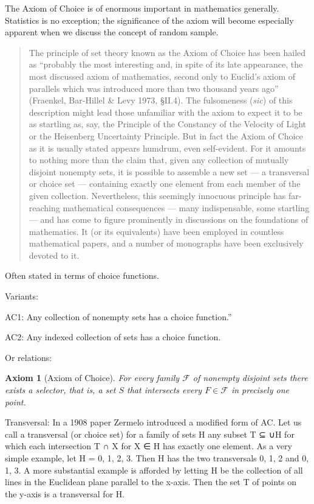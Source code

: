 \documentclass[reqno,12pt]{article}
\numberwithin{equation}{subsection}
\newtheorem{axiom}{Axiom}
\begin{document}
The Axiom of Choice is of enormous important in mathematics generally.
Statistics is no exception; the significance of the axiom will become
especially apparent when we discuss the concept of random sample.

\blockquote{The principle of set theory known as the Axiom of Choice has been hailed as “probably the most interesting and, in spite of its late appearance, the most discussed axiom of mathematics, second only to Euclid's axiom of parallels which was introduced more than two thousand years ago” (Fraenkel, Bar-Hillel \& Levy 1973, §II.4).  The fulsomeness (\textit{sic}) of this description might lead those unfamiliar with the axiom to expect it to be as startling as, say, the Principle of the Constancy of the Velocity of Light or the Heisenberg Uncertainty Principle. But in fact the Axiom of Choice as it is usually stated appears humdrum, even self-evident. For it amounts to nothing more than the claim that, given any collection of mutually disjoint nonempty sets, it is possible to assemble a new set — a transversal or choice set — containing exactly one element from each member of the given collection. Nevertheless, this seemingly innocuous principle has far-reaching mathematical consequences — many indispensable, some startling — and has come to figure prominently in discussions on the foundations of mathematics. It (or its equivalents) have been employed in countless mathematical papers, and a number of monographs have been exclusively devoted to it.\parencite{bell_axiom_2013}}

Often stated in terms of choice functions.

Variants:

AC1: 
Any collection of nonempty sets has a choice function.''

AC2: 
Any indexed collection of sets has a choice function.

Or relations:

\begin{axiom}[Axiom of Choice]
\label{ax:choice}
For every family $\mathcal{F}$ of nonempty disjoint sets there exists
a \textit{selector}, that is, a set $S$ that intersects every $F\in
\mathcal{F}$ in precisely one point.\parencite{ciesielski_set_1997}
\end{axiom}

Transversal:  In a 1908 paper Zermelo introduced a modified form of AC. Let us call a transversal (or choice set) for a family of sets H any subset T ⊆ ∪H for which each intersection T ∩ X for X ∈ H has exactly one element.  As a very simple example, let H = {{0}, {1}, {2, 3}}. Then H has the two transversals {0, 1, 2} and {0, 1, 3}. A more substantial example is afforded by letting H be the collection of all lines in the Euclidean plane parallel to the x-axis. Then the set T of points on the y-axis is a transversal for H.
\end{document}
